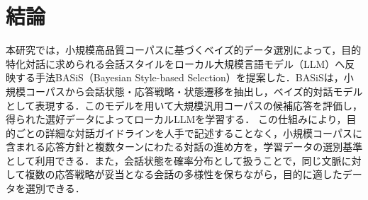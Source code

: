 \documentclass[manuscript,review,anonymous]{acmart}
\begin{document}

\section{結論}
\label{sec:conclusion}

本研究では，小規模高品質コーパスに基づくベイズ的データ選別によって，目的特化対話に求められる会話スタイルをローカル大規模言語モデル（LLM）へ反映する手法BASiS（Bayesian Style-based Selection）を提案した．BASiSは，小規模コーパスから会話状態・応答戦略・状態遷移を抽出し，ベイズ的対話モデルとして表現する．このモデルを用いて大規模汎用コーパスの候補応答を評価し，得られた選好データによってローカルLLMを学習する．
この仕組みにより，目的ごとの詳細な対話ガイドラインを人手で記述することなく，小規模コーパスに含まれる応答方針と複数ターンにわたる対話の進め方を，学習データの選別基準として利用できる．また，会話状態を確率分布として扱うことで，同じ文脈に対して複数の応答戦略が妥当となる会話の多様性を保ちながら，目的に適したデータを選別できる．
\end{document}
